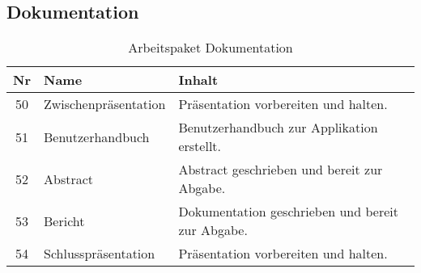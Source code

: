 \subsection{Dokumentation}
\begin{table}[H]
\begin{tabularx}{\textwidth}{ c | l | X }
\textbf{Nr} & \textbf{Name} & \textbf{Inhalt} \\ \hline
50 & Zwischenpräsentation & Präsentation vorbereiten und halten.\\ \hline
51 & Benutzerhandbuch & Benutzerhandbuch zur Applikation erstellt.\\ \hline
52 & Abstract & Abstract geschrieben und bereit zur Abgabe.\\ \hline
53 & Bericht & Dokumentation geschrieben und bereit zur Abgabe.\\ \hline
54 & Schlusspräsentation & Präsentation vorbereiten und halten.\\ 
\end{tabularx}
\caption{Arbeitspaket Dokumentation}
\end{table}